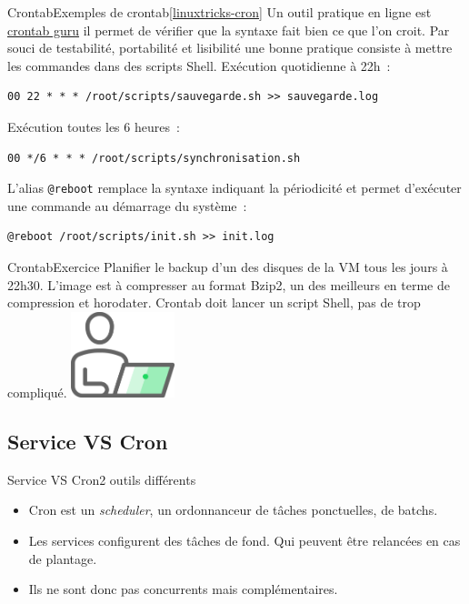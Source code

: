 \documentclass{beamer}
\begin{document}
    \begin{frame}[fragile]{Crontab}{Exemples de crontab\cref{linuxtricks-cron}}
        Un outil pratique en ligne est \href{https://crontab.guru/}{crontab guru} il permet de vérifier que la syntaxe fait bien ce que l'on croit.
        \bigbreak
        Par souci de testabilité, portabilité et lisibilité une bonne pratique consiste à mettre les commandes dans des scripts Shell.
        \bigbreak
        Exécution quotidienne à 22h~:
        \begin{lstlisting}
00 22 * * * /root/scripts/sauvegarde.sh >> sauvegarde.log
        \end{lstlisting}

        Exécution toutes les 6 heures~:
        \begin{lstlisting}
00 */6 * * * /root/scripts/synchronisation.sh
        \end{lstlisting}
        \bigbreak
        L'alias \lstinline{@reboot} remplace la syntaxe indiquant la périodicité et permet d'exécuter une commande au démarrage du système~:
        \begin{lstlisting}
@reboot /root/scripts/init.sh >> init.log
        \end{lstlisting}
    \end{frame}

    \begin{frame}{Crontab}{Exercice \execcounterdispinc{}}
        Planifier le backup d'un des disques de la VM tous les jours à 22h30.
        L'image est à compresser au format Bzip2, un des meilleurs en terme de compression et horodater.
        \bigbreak
        Crontab doit lancer un script Shell, pas de  trop compliqué.
        \bigbreak
        \centering
        \includegraphics[width=3cm]{image/guy-in-front-of-desktop}
    \end{frame}

    \subsection{Service VS Cron}\label{subsec:service-vs-cron}

    \begin{frame}{Service VS Cron}{2 outils différents}
        \begin{itemize}
            \item Cron est un \textit{scheduler}, un ordonnanceur de tâches ponctuelles, de batchs.
            \item Les services configurent des tâches de fond.
            Qui peuvent être relancées en cas de plantage.
            \item Ils ne sont donc pas concurrents mais complémentaires.
        \end{itemize}
    \end{frame}
\end{document}
